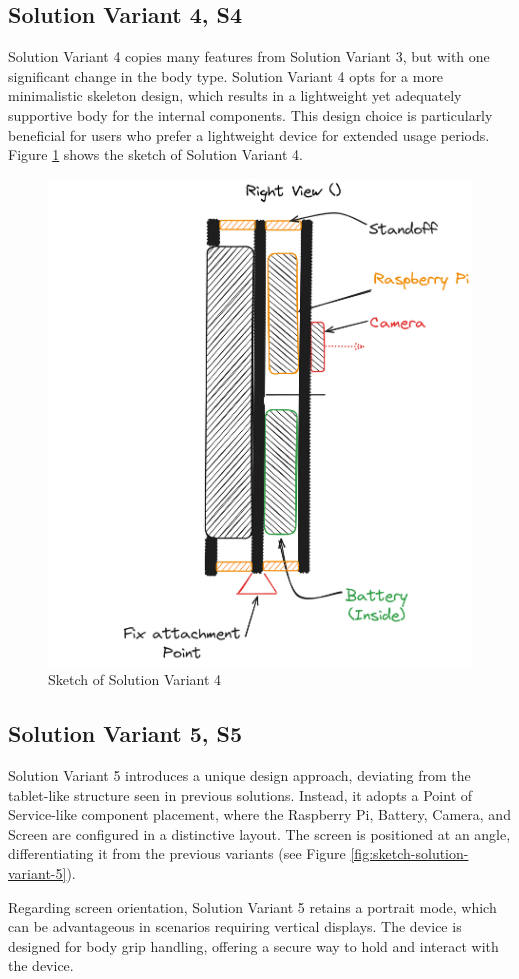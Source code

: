 \subsection{Solution Variant 4, S4}
Solution Variant 4 copies many features from Solution Variant 3, but with one significant change in the body type. Solution Variant 4 opts for a more minimalistic skeleton design, which results in a lightweight yet adequately supportive body for the internal components. This design choice is particularly beneficial for users who prefer a lightweight device for extended usage periods. Figure \ref{fig:sketch-solution-variant-4} shows the sketch of Solution Variant 4.

\begin{figure}[H]
    \centering
    \includegraphics[width=0.5\linewidth]{texs/Part1/chapter3/image/v4.png}
    \caption{Sketch of Solution Variant 4}
    \label{fig:sketch-solution-variant-4}
\end{figure}

\subsection{Solution Variant 5, S5}
Solution Variant 5 introduces a unique design approach, deviating from the tablet-like structure seen in previous solutions. Instead, it adopts a Point of Service-like component placement, where the Raspberry Pi, Battery, Camera, and Screen are configured in a distinctive layout. The screen is positioned at an angle, differentiating it from the previous variants (see Figure \ref{fig:sketch-solution-variant-5}).

Regarding screen orientation, Solution Variant 5 retains a portrait mode, which can be advantageous in scenarios requiring vertical displays. The device is designed for body grip handling, offering a secure way to hold and interact with the device.

